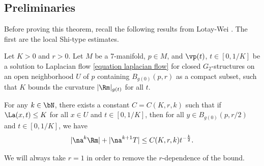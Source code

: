 \documentclass[hidelinks, 12pt, oneside, reqno]{amsart}
\begin{document}
\subsection{Preliminaries}

Before proving this theorem, recall the following results from Lotay-Wei \cite{LotayWeiLaplacianFlow}. The first are the local Shi-type estimates.

\begin{thm}\cite[Theorem 4.4]{LotayWeiLaplacianFlow}\label{theorem local shi estimates}
Let $K>0$ and $r> 0$. Let $M$ be a 7-manifold, $p \in M$, and $\vp(t)$, $t \in [0,1/K]$ be a solution to Laplacian flow \eqref{equation laplacian flow} for closed $G_2$-structures on an open neighborhood $U$ of $p$ containing $B_{g(0)}(p,r)$ as a compact subset, such that $K$ bounds the curvature $|\Rm|_{g(t)}$ for all $t$.

For any $k \in \bN$, there exists a constant $C = C(K,r,k)$ such that if $\La(x,t) \le K$ for all $x \in U$ and $t \in [0,1/K]$, then for all $y \in B_{g(0)}(p, r/2)$ and $t \in [0,1/K]$, we have
\[
|\na^k \Rm | + |\na^{k+1}T| \le C(K,r,k)t^{-\frac{k}{2}}.
\]
\end{thm}

\begin{rmk}
We will always take $r = 1$ in order to remove the $r$-dependence of the bound.
\end{rmk}
\end{document}
